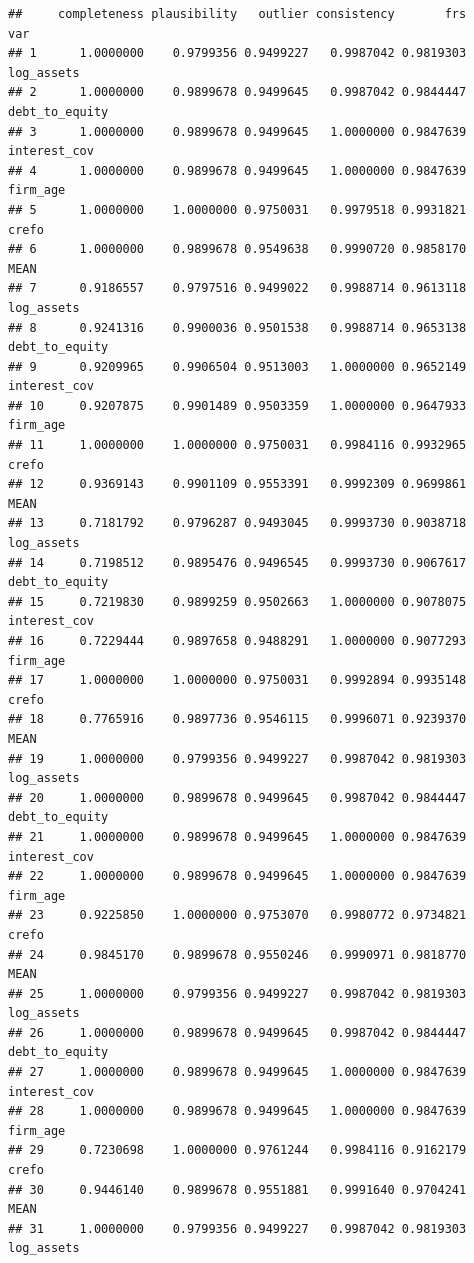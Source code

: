 \documentclass[
]{article}
\begin{document}
\begin{verbatim}
##     completeness plausibility   outlier consistency       frs            var
## 1      1.0000000    0.9799356 0.9499227   0.9987042 0.9819303     log_assets
## 2      1.0000000    0.9899678 0.9499645   0.9987042 0.9844447 debt_to_equity
## 3      1.0000000    0.9899678 0.9499645   1.0000000 0.9847639   interest_cov
## 4      1.0000000    0.9899678 0.9499645   1.0000000 0.9847639       firm_age
## 5      1.0000000    1.0000000 0.9750031   0.9979518 0.9931821          crefo
## 6      1.0000000    0.9899678 0.9549638   0.9990720 0.9858170           MEAN
## 7      0.9186557    0.9797516 0.9499022   0.9988714 0.9613118     log_assets
## 8      0.9241316    0.9900036 0.9501538   0.9988714 0.9653138 debt_to_equity
## 9      0.9209965    0.9906504 0.9513003   1.0000000 0.9652149   interest_cov
## 10     0.9207875    0.9901489 0.9503359   1.0000000 0.9647933       firm_age
## 11     1.0000000    1.0000000 0.9750031   0.9984116 0.9932965          crefo
## 12     0.9369143    0.9901109 0.9553391   0.9992309 0.9699861           MEAN
## 13     0.7181792    0.9796287 0.9493045   0.9993730 0.9038718     log_assets
## 14     0.7198512    0.9895476 0.9496545   0.9993730 0.9067617 debt_to_equity
## 15     0.7219830    0.9899259 0.9502663   1.0000000 0.9078075   interest_cov
## 16     0.7229444    0.9897658 0.9488291   1.0000000 0.9077293       firm_age
## 17     1.0000000    1.0000000 0.9750031   0.9992894 0.9935148          crefo
## 18     0.7765916    0.9897736 0.9546115   0.9996071 0.9239370           MEAN
## 19     1.0000000    0.9799356 0.9499227   0.9987042 0.9819303     log_assets
## 20     1.0000000    0.9899678 0.9499645   0.9987042 0.9844447 debt_to_equity
## 21     1.0000000    0.9899678 0.9499645   1.0000000 0.9847639   interest_cov
## 22     1.0000000    0.9899678 0.9499645   1.0000000 0.9847639       firm_age
## 23     0.9225850    1.0000000 0.9753070   0.9980772 0.9734821          crefo
## 24     0.9845170    0.9899678 0.9550246   0.9990971 0.9818770           MEAN
## 25     1.0000000    0.9799356 0.9499227   0.9987042 0.9819303     log_assets
## 26     1.0000000    0.9899678 0.9499645   0.9987042 0.9844447 debt_to_equity
## 27     1.0000000    0.9899678 0.9499645   1.0000000 0.9847639   interest_cov
## 28     1.0000000    0.9899678 0.9499645   1.0000000 0.9847639       firm_age
## 29     0.7230698    1.0000000 0.9761244   0.9984116 0.9162179          crefo
## 30     0.9446140    0.9899678 0.9551881   0.9991640 0.9704241           MEAN
## 31     1.0000000    0.9799356 0.9499227   0.9987042 0.9819303     log_assets

\end{verbatim}
\end{document}
